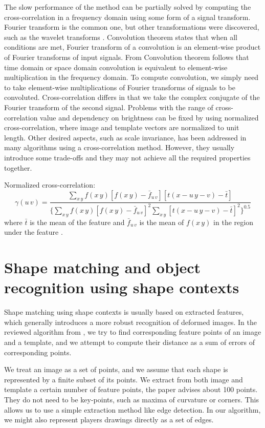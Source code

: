 The slow performance of the method can be partially solved by computing the cross-correlation in a frequency domain using some form of a signal transform. Fourier transform is the common one, but other transformations were discovered, such as the wavelet transforms \cite{patternRecNN}. 
Convolution theorem states that when all conditions are met, Fourier transform of a convolution is an element-wise product of Fourier transforms of input signals. From Convolution theorem follows that time domain or space domain convolution is equivalent to element-wise multiplication in the frequency domain. To compute convolution, we simply need to take element-wise multiplications of Fourier transforms of signals to be convoluted. Cross-correlation differs in that we take the complex conjugate of the Fourier transform of the second signal.
Problems with the range of cross-correlation value and dependency on brightness can be fixed by using normalized cross-correlation, where image and template vectors are normalized to unit length. Other desired aspects, such as scale invariance, has been addressed in many algorithms using a cross-correlation method. However, they usually introduce some trade-offs and they may not achieve all the required properties together. 

Normalized cross-correlation:
\begin{equation*}
\gamma(u\,v) = \frac{\sum_{x\,y}f(x\,y) [f(x\,y)-\bar{f}_{u\,v}][t(x-u\,y-v)-\bar{t}]} {\{ \sum_{x\,y}f(x\,y) [f(x\,y)-\bar{f}_{u\,v}]^2 \sum_{x\,y}[t(x-u\,y-v)-\bar{t}]^2  \}^{0.5}}
\end{equation*}
where $\bar{t}$ is the mean of the feature and $\bar{f}_{u\,v}$ is the mean of $f(x\,y)$ in the region under the feature \cite{crossCorrLewis}.

\section{Shape matching and object recognition using shape contexts}
Shape matching using shape contexts is usually based on extracted features, which generally introduces a more robust recognition of deformed images. In the reviewed algorithm from , we try to find corresponding feature points of an image and a template, and we attempt to compute their distance as a sum of errors of corresponding points.

We treat an image as a set of points, and we assume that each shape is represented by a finite subset of its points. We extract from both image and template a certain number of feature points, the paper advises about 100 points. They do not need to be key-points, such as maxima of curvature or corners. This allows us to use a simple extraction method like edge detection. In our algorithm, we might also represent players drawings directly as a set of edges. 

